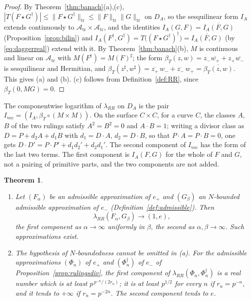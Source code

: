 \documentclass[11pt]{amsart}
\newtheorem{theorem}{Theorem}[section]
\theoremstyle{definition}
\theoremstyle{remark}
\newcommand{\DA}{D_A}
\begin{document}
\begin{proof}
By Theorem~\ref{thm:banach}(a),(c),
$|T(F\star G^{\dagger})|\le\lVert F\star G^{\dagger}\rVert_{\mathrm{tr}}\le
\lVert F\rVert_{\mathrm{tr}}\lVert G\rVert_{\mathrm{tr}}$ on $\DA$, so the
sesquilinear form $I_A$ extends continuously to $\mathcal A_{\mathrm{tr}}\times\mathcal A_{\mathrm{tr}}$, and the
identities $I_A(G,F)=\overline{I_A(F,G)}$ (Proposition~\ref{prop:bilin}) and
$I_A(F^{\dagger},G^{\dagger})=T\bigl((F\star G^{\dagger})^{\dagger}\bigr)
=\overline{I_A(F,G)}$ (by \eqref{eq:daggerreal}) extend with it.  By
Theorem~\ref{thm:banach}(b), $M$ is continuous and linear on $\mathcal A_{\mathrm{tr}}$ with
$M(F^{\dagger})=M(F)^{\sharp}$; the form
$\beta_T(z,w)=z_-\overline{w_+}+z_+\overline{w_-}$ is sesquilinear and
Hermitian, and
$\beta_T(z^{\sharp},w^{\sharp})=\overline{z_+}\,w_-+\overline{z_-}\,w_+
=\overline{\beta_T(z,w)}$.  This gives (a) and (b).  (c) follows from
Definition~\ref{def:RR}, since $\beta_T(0,MG)=0$.
\end{proof}

The componentwise logarithm of $\lambda_{RR}$ on $\DA$ is the pair
$I_{\mathrm{vec}}=(I_A,\beta_T\circ(M\times M))$.  On the surface
$C\times C$, for a curve $C$, the classes $A$, $B$ of the two rulings satisfy
$A^{2}=B^{2}=0$ and $A\cdot B=1$; writing a divisor class as
$D=P+d_2A+d_1B$ with $d_1=D\cdot A$, $d_2=D\cdot B$, so that
$P\cdot A=P\cdot B=0$, one gets
$D\cdot D'=P\cdot P'+d_1d_2'+d_2d_1'$.  The second component of
$I_{\mathrm{vec}}$ has the form of the last two terms.  The first component
is $I_A(F,G)$ for the whole of $F$ and $G$, not a pairing of primitive parts,
and the two components are not added.

\begin{theorem}\label{thm:scalartrivial}
\begin{enumerate}
\item[(a)] Let $(F_{\alpha})$ be an admissible approximation of $e_+$ and
$(G_{\beta})$ an $N$-bounded admissible approximation of $e_-$
(Definition~\ref{def:admissible}).  Then
\begin{equation}\label{eq:trivial}
\lambda_{RR}(F_{\alpha},G_{\beta})\longrightarrow(1,e),
\end{equation}
the first component as $\alpha\to\infty$ uniformly in $\beta$, the second as
$\alpha,\beta\to\infty$.  Such approximations exist.
\item[(b)] The hypothesis of $N$-boundedness cannot be omitted in (a).  For
the admissible approximations $(\Phi_n)$ of $e_+$ and $(\Phi_n^{\dagger})$ of
$e_-$ of Proposition~\ref{prop:rulingsdiv}, the first component of
$\lambda_{RR}(\Phi_n,\Phi_n^{\dagger})$ is a real number which is at least
$p^{\,p^{-n}/(2r_n)}$; it is at least $p^{1/2}$ for every $n$ if $r_n=p^{-n}$,
and it tends to $+\infty$ if $r_n=p^{-2n}$.  The second component tends to
$e$.
\end{enumerate}
\end{theorem}
\end{document}
